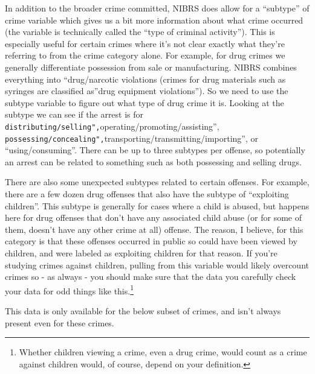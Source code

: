 \documentclass[
  12pt,
  openany]{book}
\begin{document}
In addition to the broader crime committed, NIBRS does allow for a ``subtype'' of crime variable which gives us a bit more information about what crime occurred (the variable is technically called the ``type of criminal activity''). This is especially useful for certain crimes where it's not clear exactly what they're referring to from the crime category alone. For example, for drug crimes we generally differentiate possession from sale or manufacturing. NIBRS combines everything into ``drug/narcotic violations (crimes for drug materials such as syringes are classified as''drug equipment violations''). So we need to use the subtype variable to figure out what type of drug crime it is. Looking at the subtype we can see if the arrest is for \texttt{distributing/selling",}operating/promoting/assisting'', \texttt{possessing/concealing",}transporting/transmitting/importing'', or ``using/consuming''. There can be up to three subtypes per offense, so potentially an arrest can be related to something such as both possessing and selling drugs.

There are also some unexpected subtypes related to certain offenses. For example, there are a few dozen drug offenses that also have the subtype of ``exploiting children''. This subtype is generally for cases where a child is abused, but happens here for drug offenses that don't have any associated child abuse (or for some of them, doesn't have any other crime at all) offense. The reason, I believe, for this category is that these offenses occurred in public so could have been viewed by children, and were labeled as exploiting children for that reason. If you're studying crimes against children, pulling from this variable would likely overcount crimes so - as always - you should make sure that the data you carefully check your data for odd things like this.\footnote{Whether children viewing a crime, even a drug crime, would count as a crime against children would, of course, depend on your definition.}

This data is only available for the below subset of crimes, and isn't always present even for these crimes.
\end{document}
